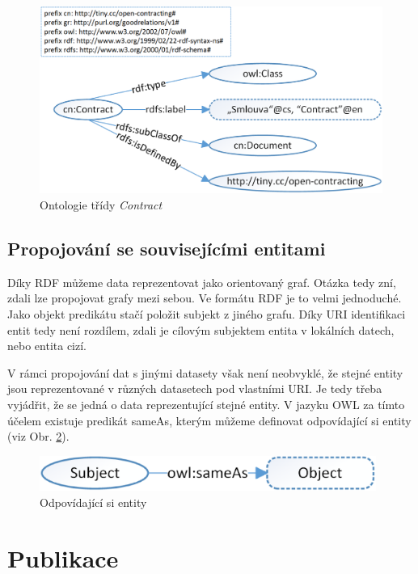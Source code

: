 \begin{figure}[h]
\centerline{\includegraphics[width=\textwidth]{img/rdf_ontologyClass.eps}}
\caption{Ontologie třídy \textit{Contract}}
\label{obr:rdf_ontologyClass}
\end{figure}

\subsection{Propojování se souvisejícími entitami}

Díky RDF můžeme data reprezentovat jako orientovaný graf. Otázka tedy zní, zdali lze propojovat grafy mezi sebou. Ve formátu RDF je to velmi jednoduché. Jako objekt predikátu stačí položit subjekt z jiného grafu. Díky URI identifikaci entit tedy není rozdílem, zdali je cílovým subjektem entita v lokálních datech, nebo entita cizí.  

V rámci propojování dat s jinými datasety však není neobvyklé, že stejné entity jsou reprezentované v různých datasetech pod vlastními URI. Je tedy třeba vyjádřit, že se jedná o data reprezentující stejné entity. V jazyku OWL za tímto účelem existuje predikát sameAs, kterým můžeme definovat odpovídající si entity (viz Obr. \ref{obr:rdf_ontologyLinks}).

\begin{figure}[h]
\centerline{\includegraphics[width=110mm]{img/rdf_ontologyLinks.eps}}
\caption{Odpovídající si entity}
\label{obr:rdf_ontologyLinks}
\end{figure}

\newpage

\section{Publikace}

